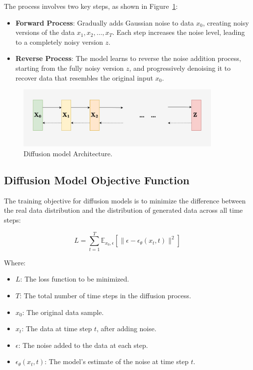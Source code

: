 The process involves two key steps, as shown in Figure~\ref{fig:Diffusion_structure}:
\begin{itemize}
  \item \textbf{Forward Process}: Gradually adds Gaussian noise to data \(x_0\), creating noisy versions of the data \(x_1, x_2, \dots, x_T\). Each step increases the noise level, leading to a completely noisy version \(z\).
  \item \textbf{Reverse Process}: The model learns to reverse the noise addition process, starting from the fully noisy version \(z\), and progressively denoising it to recover data that resembles the original input \(x_0\).
\end{itemize}

\begin{figure}[H]
    \centering
    \includegraphics[width=0.9\textwidth]{./Images/Diffusion_structure.jpg}
    \caption{Diffusion model Architecture.}
    \label{fig:Diffusion_structure}
\end{figure}

\subsection{Diffusion Model Objective Function}

The training objective for diffusion models is to minimize the difference between the real data distribution and the distribution of generated data across all time steps:

\begin{equation}
L = \sum_{t=1}^{T} \mathbb{E}_{x_0, \epsilon} \left[ \|\epsilon - \epsilon_\theta(x_t, t)\|^2 \right]
\end{equation}

Where:
\begin{itemize}
    \item \(L\): The loss function to be minimized.
    \item \(T\): The total number of time steps in the diffusion process.
    \item \(x_0\): The original data sample.
    \item \(x_t\): The data at time step \(t\), after adding noise.
    \item \(\epsilon\): The noise added to the data at each step.
    \item \(\epsilon_\theta(x_t, t)\): The model's estimate of the noise at time step \(t\).
\end{itemize}


